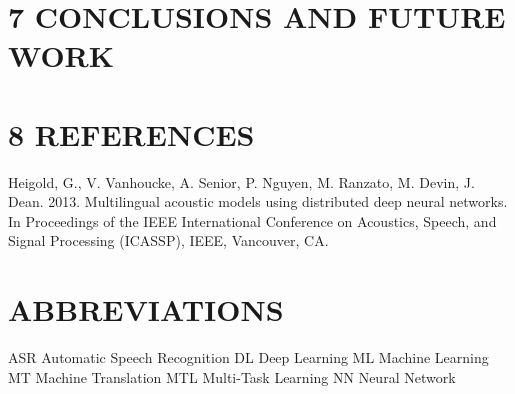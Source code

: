 \documentclass[11pt]{article}
\begin{document}
\section{7 CONCLUSIONS AND FUTURE WORK}
\label{sec-6}
\section{8 REFERENCES}
\label{sec-7}

Heigold, G., V. Vanhoucke, A. Senior, P. Nguyen, M. Ranzato, M. Devin, J. Dean. 2013. Multilingual acoustic models using distributed deep neural networks. In Proceedings of the IEEE International Conference on Acoustics, Speech, and Signal Processing (ICASSP), IEEE, Vancouver, CA.
\section{ABBREVIATIONS}
\label{sec-8}
ASR        Automatic Speech Recognition
DL        Deep Learning
ML        Machine Learning
MT        Machine Translation
MTL        Multi-Task Learning
NN        Neural Network
\end{document}
